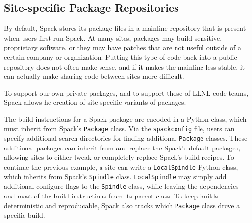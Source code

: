 \subsection{Site-specific Package Repositories}

By default, Spack stores its package files in a mainline repository that is present when users
first run Spack.  At many sites, packages may build sensitive, proprietary software, or they 
may have patches that are not useful outside of a certain company or organization.  Putting
this type of code back into a public repository does not often make sense, and if it makes the
mainline less stable, it can actually make sharing code between sites more difficult.  

To support our own private packages, and to support those of LLNL code teams, Spack allows he creation of site-specific variants of packages.  

The build instructions for a Spack package are encoded in a Python class, which must inherit from Spack's {\tt Package} class.  Via the {\tt spackconfig} file, users can specify additional search directories for finding additional {\tt Package} classes.  These additional packages can inherit from and replace the Spack's default packages, allowing sites to either tweak or completely replace Spack's build recipes.  To continue the previous example, a site can write a {\tt LocalSpindle} Python class, which inherits from Spack's {\tt Spindle} class.  {\tt LocalSpindle} may simply add additional configure flags to the {\tt Spindle} class, while leaving the dependencies and most of the build instructions from its parent class.  To keep builds deterministic and reproducable, Spack also tracks which {\tt Package} class drove a specific build. 









